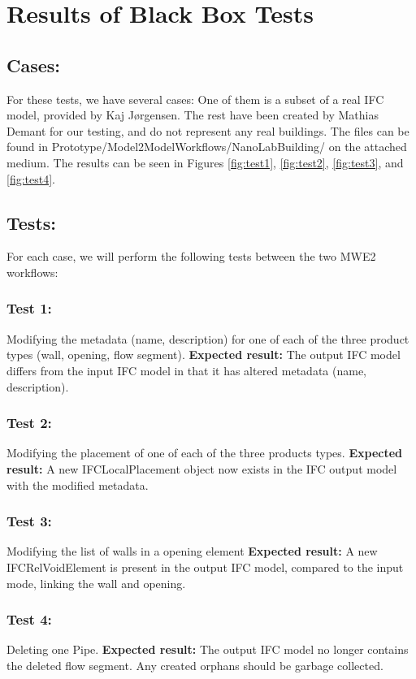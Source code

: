 \newpage
\appendix
\section{Results of Black Box Tests}
\label{app:blackboxtests}
\subsection{Cases:}
For these tests, we have several cases: One of them is a subset of a real IFC model, provided by Kaj J\o rgensen. The rest have been created by Mathias Demant for our testing, and do not represent any real buildings. The files can be found in Prototype/Model2ModelWorkflows/NanoLabBuilding/ on the attached medium. The results can be seen in Figures \ref{fig:test1}, \ref{fig:test2}, \ref{fig:test3}, and \ref{fig:test4}.
\subsection{Tests:}
For each case, we will perform the following tests between the two MWE2 workflows:
\subsubsection{Test 1:}
Modifying the metadata (name, description) for one of each of the three product types (wall, opening, flow segment).
\textbf{Expected result:} The output IFC model differs from the input IFC model in that it has altered metadata (name, description).
\subsubsection{Test 2:}
Modifying the placement of one of each of the three products types.
\textbf{Expected result:} A new IFCLocalPlacement object now exists in the IFC output model with the modified metadata. 
\subsubsection{Test 3:}
Modifying the list of walls in a opening element
\textbf{Expected result:} A new IFCRelVoidElement is present in the output IFC model, compared to the input mode, linking the wall and opening.
\subsubsection{Test 4:}
Deleting one Pipe.
\textbf{Expected result:} The output IFC model no longer contains the deleted flow segment. Any created orphans should be garbage collected.
